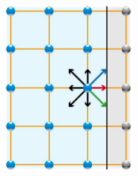 \begin{figure}[H]
  \centering
  \begin{subfigure}[h]{0.3\textwidth}
    \includegraphics[width=\textwidth]{img/fig9-1.png}
  \end{subfigure}
  \begin{subfigure}[h]{0.3\textwidth}

\end{subfigure}
\end{figure}
